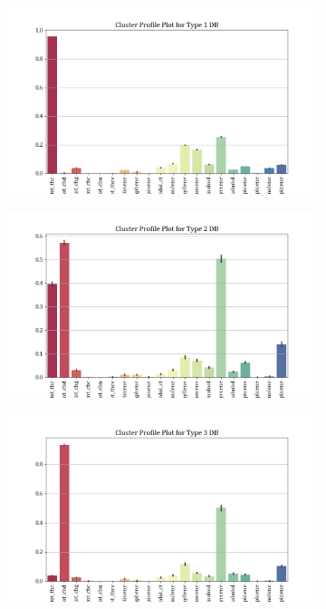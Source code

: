\documentclass[11pt,a4paper]{article}
\begin{document}
\begin{figure}[H]
     \centering
     \begin{subfigure}[b]{0.475\textwidth}
         \centering
         \includegraphics[width=\textwidth]{images/db_chem_composition_1.png}
         \label{fig:db_clust_1}
     \end{subfigure}
     \hfill
     \begin{subfigure}[b]{0.475\textwidth}
         \centering
         \includegraphics[width=\textwidth]{images/db_chem_composition_2.png}
         \label{fig:db_clust_2}
     \end{subfigure}
     \hfill
     \begin{subfigure}[b]{0.475\textwidth}
         \centering
         \includegraphics[width=\textwidth]{images/db_chem_composition_3.png}

\end{subfigure}
\end{figure}
\end{document}
